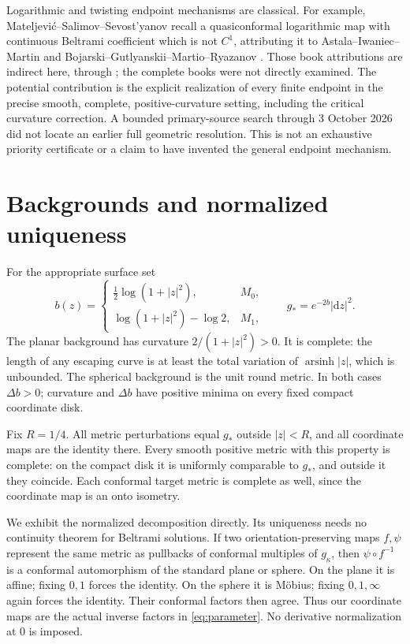 \documentclass[11pt]{article}
\newcommand{\dd}{\mathrm d}
\begin{document}
Logarithmic and twisting endpoint mechanisms are classical. For example, Mateljevi\'c--Salimov--Sevost'yanov \cite[Section 7, Example 5]{MSS22} recall a quasiconformal logarithmic map with continuous Beltrami coefficient which is not $C^1$, attributing it to Astala--Iwaniec--Martin \cite{AIM09} and Bojarski--Gutlyanskii--Martio--Ryazanov \cite{BGR13}. Those book attributions are indirect here, through \cite{MSS22}; the complete books were not directly examined. The potential contribution is the explicit realization of every finite endpoint in the precise smooth, complete, positive-curvature setting, including the critical curvature correction. A bounded primary-source search through 3 October 2026 did not locate an earlier full geometric resolution. This is not an exhaustive priority certificate or a claim to have invented the general endpoint mechanism.

\section{Backgrounds and normalized uniqueness}
For the appropriate surface set
\begin{equation}\label{eq:background}
 b(z)=\begin{cases}\frac12\log(1+|z|^2),&M_0,\\
 \log(1+|z|^2)-\log2,&M_1,
 \end{cases}\qquad g_*=e^{-2b}|\dd z|^2.
\end{equation}
The planar background has curvature $2/(1+|z|^2)>0$. It is complete: the length of any escaping curve is at least the total variation of $\operatorname{arsinh}|z|$, which is unbounded. The spherical background is the unit round metric. In both cases $\Delta b>0$; curvature and $\Delta b$ have positive minima on every fixed compact coordinate disk.

Fix $R=1/4$. All metric perturbations equal $g_*$ outside $|z|<R$, and all coordinate maps are the identity there. Every smooth positive metric with this property is complete: on the compact disk it is uniformly comparable to $g_*$, and outside it they coincide. Each conformal target metric is complete as well, since the coordinate map is an onto isometry.

We exhibit the normalized decomposition directly. Its uniqueness needs no continuity theorem for Beltrami solutions. If two orientation-preserving maps $f,\psi$ represent the same metric as pullbacks of conformal multiples of $g_\kappa$, then $\psi\circ f^{-1}$ is a conformal automorphism of the standard plane or sphere. On the plane it is affine; fixing $0,1$ forces the identity. On the sphere it is M\"obius; fixing $0,1,\infty$ again forces the identity. Their conformal factors then agree. Thus our coordinate maps are the actual inverse factors in \eqref{eq:parameter}. No derivative normalization at $0$ is imposed.
\end{document}
